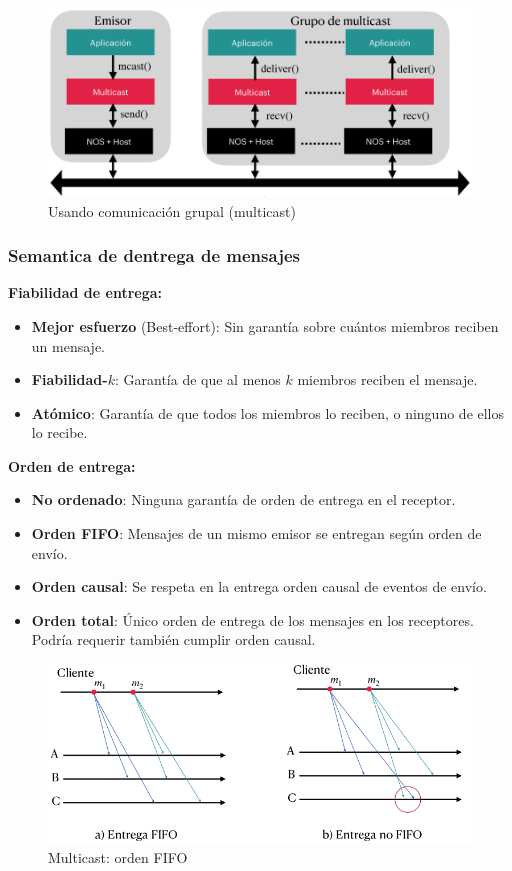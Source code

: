 \begin{figure}[H]
    \centering
    \includegraphics[width=1.0\linewidth]{img/Multicast_grupal.png}
    \caption{Usando comunicación grupal (multicast)}\label{fig:1761651184845}
\end{figure}
\subsubsection{Semantica de dentrega de mensajes}
\textbf{Fiabilidad de entrega:}
\begin{itemize}
    \item \textbf{Mejor esfuerzo} (Best-effort): Sin garantía sobre cuántos miembros reciben un mensaje.
    \item \textbf{Fiabilidad-}$k$: Garantía de que al menos $k$ miembros reciben el mensaje.
    \item \textbf{Atómico}: Garantía de que todos los miembros lo reciben, o ninguno de ellos lo recibe.
\end{itemize}
\textbf{Orden de entrega:}
\begin{itemize}
    \item \textbf{No ordenado}: Ninguna garantía de orden de entrega en el receptor.
    \item \textbf{Orden FIFO}: Mensajes de un mismo emisor se entregan según orden de envío.
    \item \textbf{Orden causal}: Se respeta en la entrega orden causal de eventos de envío.
    \item \textbf{Orden total}: Único orden de entrega de los mensajes en los receptores. Podría requerir también cumplir orden causal.
\end{itemize}

\begin{figure}[H]
    \centering
    \includegraphics[width=0.7\linewidth]{img/multi_fifo.png}
    \caption{Multicast: orden FIFO}\label{fig:1761678535409}
\end{figure}

